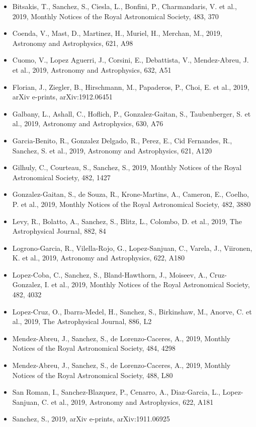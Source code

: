 \documentclass{letter}
\begin{document}
\begin{enumerate}
\begin{itemize}
\item Bitsakis, T., Sanchez, S., Ciesla, L., Bonfini, P., Charmandaris, V. et al., 2019, Monthly Notices of the Royal Astronomical Society, 483, 370
\item Coenda, V., Mast, D., Martinez, H., Muriel, H., Merchan, M., 2019, Astronomy and Astrophysics, 621, A98
\item Cuomo, V., Lopez Aguerri, J., Corsini, E., Debattista, V., Mendez-Abreu, J. et al., 2019, Astronomy and Astrophysics, 632, A51
\item Florian, J., Ziegler, B., Hirschmann, M., Papaderos, P., Choi, E. et al., 2019, arXiv e-prints, arXiv:1912.06451
\item Galbany, L., Ashall, C., Hoflich, P., Gonzalez-Gaitan, S., Taubenberger, S. et al., 2019, Astronomy and Astrophysics, 630, A76
\item Garcia-Benito, R., Gonzalez Delgado, R., Perez, E., Cid Fernandes, R., Sanchez, S. et al., 2019, Astronomy and Astrophysics, 621, A120
\item Gilhuly, C., Courteau, S., Sanchez, S., 2019, Monthly Notices of the Royal Astronomical Society, 482, 1427
\item Gonzalez-Gaitan, S., de Souza, R., Krone-Martins, A., Cameron, E., Coelho, P. et al., 2019, Monthly Notices of the Royal Astronomical Society, 482, 3880
\item Levy, R., Bolatto, A., Sanchez, S., Blitz, L., Colombo, D. et al., 2019, The Astrophysical Journal, 882, 84
\item Logrono-Garcia, R., Vilella-Rojo, G., Lopez-Sanjuan, C., Varela, J., Viironen, K. et al., 2019, Astronomy and Astrophysics, 622, A180
\item Lopez-Coba, C., Sanchez, S., Bland-Hawthorn, J., Moiseev, A., Cruz-Gonzalez, I. et al., 2019, Monthly Notices of the Royal Astronomical Society, 482, 4032
\item Lopez-Cruz, O., Ibarra-Medel, H., Sanchez, S., Birkinshaw, M., Anorve, C. et al., 2019, The Astrophysical Journal, 886, L2
\item Mendez-Abreu, J., Sanchez, S., de Lorenzo-Caceres, A., 2019, Monthly Notices of the Royal Astronomical Society, 484, 4298
\item Mendez-Abreu, J., Sanchez, S., de Lorenzo-Caceres, A., 2019, Monthly Notices of the Royal Astronomical Society, 488, L80
\item San Roman, I., Sanchez-Blazquez, P., Cenarro, A., Diaz-Garcia, L., Lopez-Sanjuan, C. et al., 2019, Astronomy and Astrophysics, 622, A181
\item Sanchez, S., 2019, arXiv e-prints, arXiv:1911.06925

\end{itemize}
\end{enumerate}
\end{document}
